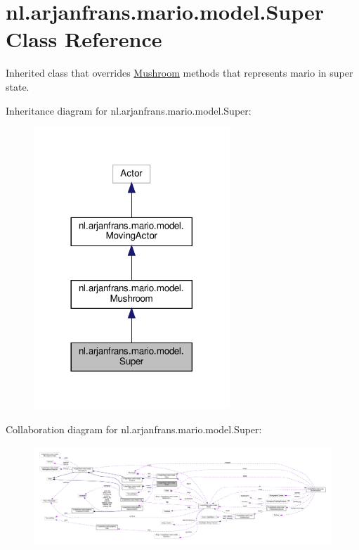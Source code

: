 \hypertarget{classnl_1_1arjanfrans_1_1mario_1_1model_1_1Super}{}\section{nl.\+arjanfrans.\+mario.\+model.\+Super Class Reference}
\label{classnl_1_1arjanfrans_1_1mario_1_1model_1_1Super}


Inherited class that overrides \hyperlink{classnl_1_1arjanfrans_1_1mario_1_1model_1_1Mushroom}{Mushroom} methods that represents mario in super state.  




Inheritance diagram for nl.\+arjanfrans.\+mario.\+model.\+Super\+:
\nopagebreak
\begin{figure}[H]
\begin{center}
\leavevmode
\includegraphics[width=209pt]{classnl_1_1arjanfrans_1_1mario_1_1model_1_1Super__inherit__graph}
\end{center}
\end{figure}


Collaboration diagram for nl.\+arjanfrans.\+mario.\+model.\+Super\+:
\nopagebreak
\begin{figure}[H]
\begin{center}
\leavevmode
\includegraphics[width=350pt]{classnl_1_1arjanfrans_1_1mario_1_1model_1_1Super__coll__graph}
\end{center}
\end{figure}
